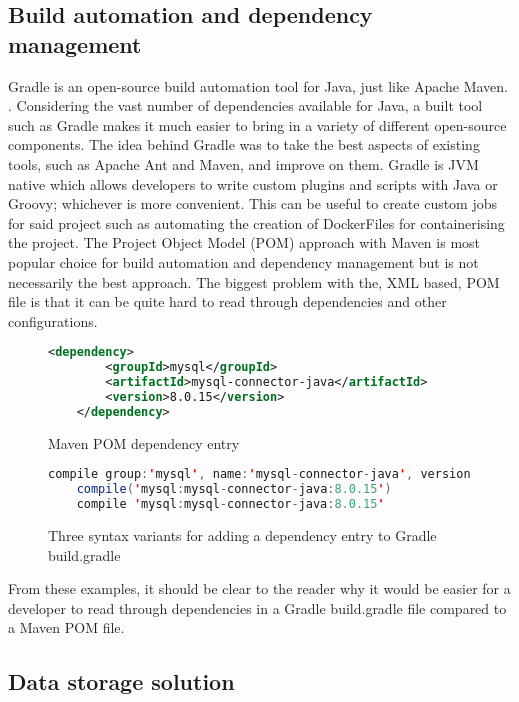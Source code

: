 \subsection{Build automation and dependency management}
Gradle is an open-source build automation tool for Java, just like Apache Maven. \cite{muschko2014gradle}.
Considering the vast number of dependencies available for Java, a built tool such as Gradle makes it much easier to bring in
a variety of different open-source components.
The idea behind Gradle was to take the best aspects of existing tools, such as Apache Ant and Maven, and improve on them.
Gradle is JVM native which allows developers to write custom plugins and scripts with Java or Groovy; whichever is more convenient.
This can be useful to create custom jobs for said project such as automating the creation of DockerFiles for containerising
the project.
The Project Object Model (POM) approach with Maven is most popular choice for build automation and dependency management but is not
necessarily the best approach. 
The biggest problem with the, XML based, POM file is that it can be quite hard to read through dependencies and other
configurations. 

\begin{figure}[htb]
    \begin{lstlisting}[language=XML, numbers=none]
    <dependency>
        <groupId>mysql</groupId>
        <artifactId>mysql-connector-java</artifactId>
        <version>8.0.15</version>
    </dependency>
    \end{lstlisting}
    \caption{Maven POM dependency entry}
\end{figure}

\begin{figure}[htb]
    \begin{lstlisting}[language=Java, numbers=none]
    compile group:'mysql', name:'mysql-connector-java', version:'8.0.15'
    compile('mysql:mysql-connector-java:8.0.15')
    compile 'mysql:mysql-connector-java:8.0.15'
    \end{lstlisting}
    \caption{Three syntax variants for adding a dependency entry to Gradle build.gradle}
\end{figure}

From these examples, it should be clear to the reader why it would be easier for a developer to read through dependencies in a Gradle build.gradle 
file compared to a Maven POM file. 


\subsection{Data storage solution}


